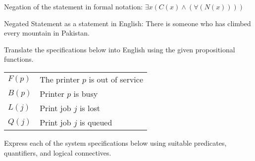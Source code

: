 \documentclass[addpoints]{exam}
\begin{document}
\begin{questions}
\begin{parts}
\begin{solution}
      Negation of the statement in formal notation:
      \newline $\exists x (C(x) \land (\forall (N(x))))$

      Negated Statement as a statement in English:
      \newline There is someone who has climbed every mountain in Pakistan.

    \end{solution}
  \end{parts}

\question
  Translate the specifications below into English using the given propositional functions.\\
  \begin{tabular}{l@{ : }l}
    $F(p)$ & The printer $p$ is out of service\\
    $B(p)$ & Printer $p$ is busy\\
    $L(j)$ & Print job $j$ is lost\\
    $Q(j)$ & Print job $j$ is queued
  \end{tabular}

\question Express each of the system specifications below using suitable predicates, quantifiers, and logical connectives.
\end{questions}
\end{document}
